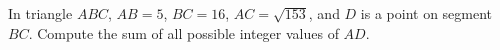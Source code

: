 In triangle $ABC$, $AB=5$, $BC=16$, $AC=\sqrt{153}$, and $D$ is a point on segment $BC$. Compute the sum of all possible integer values of $AD$.
